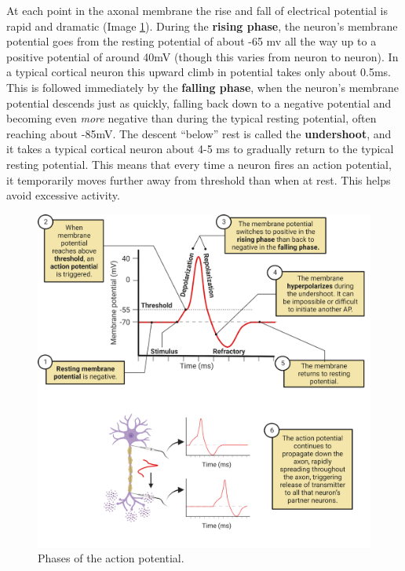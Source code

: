 \documentclass[
]{book}
\begin{document}
At each point in the axonal membrane the rise and fall of electrical potential is rapid and dramatic (Image \ref{fig:action-potential-phases}). During the \textbf{rising phase}, the neuron's membrane potential goes from the resting potential of about -65 mv all the way up to a positive potential of around 40mV (though this varies from neuron to neuron). In a typical cortical neuron this upward climb in potential takes only about 0.5ms. This is followed immediately by the \textbf{falling phase}, when the neuron's membrane potential descends just as quickly, falling back down to a negative potential and becoming even \emph{more} negative than during the typical resting potential, often reaching about -85mV. The descent ``below'' rest is called the \textbf{undershoot}, and it takes a typical cortical neuron about 4-5 ms to gradually return to the typical resting potential. This means that every time a neuron fires an action potential, it temporarily moves further away from threshold than when at rest. This helps avoid excessive activity.

\begin{figure}

{\centering \includegraphics[width=0.9\linewidth]{images/ch02/02_24} 

}

\caption{Phases of the action potential.}\label{fig:action-potential-phases}
\end{figure}
\end{document}
